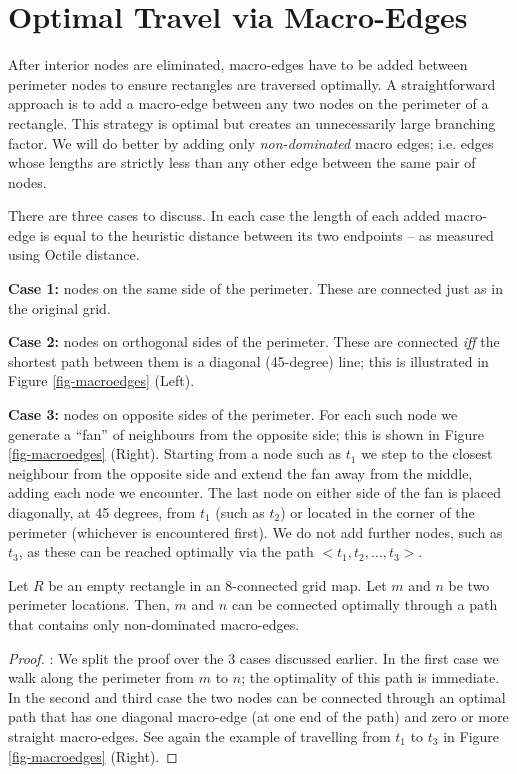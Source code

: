 \section{Optimal Travel via Macro-Edges}

After interior nodes are eliminated, macro-edges have to be added between perimeter
nodes to ensure rectangles are traversed optimally.
A straightforward approach is to add a macro-edge between any
two nodes on the perimeter of a rectangle. This strategy is optimal but creates
an unnecessarily large branching factor. 
We will do better by adding only \emph{non-dominated} macro edges; i.e. edges whose 
lengths are strictly less than any other edge between the same pair of nodes.
\par
There are three cases to discuss. In each case the length of each added macro-edge 
is equal to the heuristic distance between its two endpoints -- as measured
using Octile distance.
\par \noindent
\textbf{Case 1:} nodes on the same side of the perimeter. These are connected
just as in the original grid.
\par \noindent
\textbf{Case 2:} nodes on orthogonal sides of the perimeter.
These are connected \emph{iff} the shortest path between them is a diagonal
(45-degree) line; this is illustrated in Figure \ref{fig-macroedges} (Left).
\par \noindent
\textbf{Case 3:} nodes on opposite sides of the perimeter. 
For each such node we generate a ``fan'' of neighbours from the opposite side; this is shown in Figure
\ref{fig-macroedges} (Right).
Starting from a node such as $t_{1}$ we step to the closest
neighbour from the opposite side and extend the fan away
from the middle, adding each node we encounter.  The last node
on either side of the fan is placed diagonally, at 45 degrees, from $t_{1}$
(such as $t_{2}$) or located in the corner of the perimeter (whichever is encountered first).  
We do not add further nodes, such as $t_{3}$, as
these can be reached optimally via the path $< t_1, t_2, \dots,
t_3 > $.

\begin{lemma} \label{lemma-rooms} Let $R$ be an empty rectangle in
an 8-connected grid map. Let $m$ and $n$ be two perimeter locations.
Then, $m$ and $n$ can be connected optimally through a path that
contains only non-dominated macro-edges.
\end{lemma}

\begin{proof}:
We split the proof over the 3 cases discussed earlier.
In the first case we walk along the perimeter from $m$ to $n$; the
optimality of this path is immediate. In the second and third case 
the two nodes can be connected through an optimal path that has one diagonal macro-edge
(at one end of the path) and zero or more straight macro-edges.
See again the example of travelling from $t_1$ to $t_3$ in Figure
\ref{fig-macroedges} (Right).
\end{proof}

